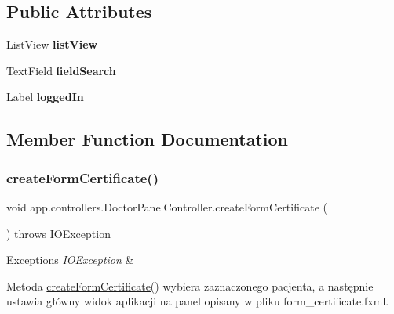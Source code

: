 \subsection*{Public Attributes}
\begin{DoxyCompactItemize}
\item 
\mbox{\label{classapp_1_1controllers_1_1_doctor_panel_controller_af1b2b0b0dd5e4ae02d88d2493e4eada5}} 
List\+View {\bfseries list\+View}
\item 
\mbox{\label{classapp_1_1controllers_1_1_doctor_panel_controller_a745f862b1638470b1ad0a3e189f54fb5}} 
Text\+Field {\bfseries field\+Search}
\item 
\mbox{\label{classapp_1_1controllers_1_1_doctor_panel_controller_a93056c4ed1e392c8d59fa921fa20701d}} 
Label {\bfseries logged\+In}
\end{DoxyCompactItemize}


\subsection{Member Function Documentation}
\mbox{\label{classapp_1_1controllers_1_1_doctor_panel_controller_a6f6ead0296b1f1045116f84b6b3efe90}} 
\subsubsection{\texorpdfstring{createFormCertificate()}{createFormCertificate()}}
{\footnotesize\ttfamily void app.\+controllers.\+Doctor\+Panel\+Controller.\+create\+Form\+Certificate (\begin{DoxyParamCaption}{ }\end{DoxyParamCaption}) throws I\+O\+Exception}


\begin{DoxyExceptions}{Exceptions}
{\em I\+O\+Exception} & \\
\hline
\end{DoxyExceptions}
Metoda \mbox{\hyperlink{classapp_1_1controllers_1_1_doctor_panel_controller_a6f6ead0296b1f1045116f84b6b3efe90}{create\+Form\+Certificate()}} wybiera zaznaczonego pacjenta, a następnie ustawia główny widok aplikacji na panel opisany w pliku form\+\_\+certificate.\+fxml. \mbox{\label{classapp_1_1controllers_1_1_doctor_panel_controller_a90a301adeea72b07910035e0e188d91c}} 
